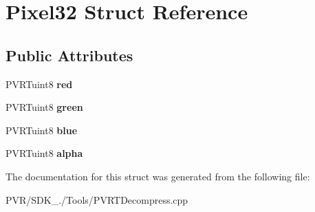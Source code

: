 \hypertarget{struct_pixel32}{\section{Pixel32 Struct Reference}
\label{struct_pixel32}
}
\subsection*{Public Attributes}
\begin{DoxyCompactItemize}
\item 
\hypertarget{struct_pixel32_adc94495586acff2932c974b4f9b571f5}{P\+V\+R\+Tuint8 {\bfseries red}}\label{struct_pixel32_adc94495586acff2932c974b4f9b571f5}

\item 
\hypertarget{struct_pixel32_a8f31918634847bf24768bc0f342bc19f}{P\+V\+R\+Tuint8 {\bfseries green}}\label{struct_pixel32_a8f31918634847bf24768bc0f342bc19f}

\item 
\hypertarget{struct_pixel32_acd9f108f0f67e1ef5dd083661a816b44}{P\+V\+R\+Tuint8 {\bfseries blue}}\label{struct_pixel32_acd9f108f0f67e1ef5dd083661a816b44}

\item 
\hypertarget{struct_pixel32_afdcfceea524a4a956be0ac49c5e25521}{P\+V\+R\+Tuint8 {\bfseries alpha}}\label{struct_pixel32_afdcfceea524a4a956be0ac49c5e25521}

\end{DoxyCompactItemize}


The documentation for this struct was generated from the following file\+:\begin{DoxyCompactItemize}
\item 
P\+V\+R/\+S\+D\+K\+\_./\+Tools/P\+V\+R\+T\+Decompress.\+cpp\end{DoxyCompactItemize}

